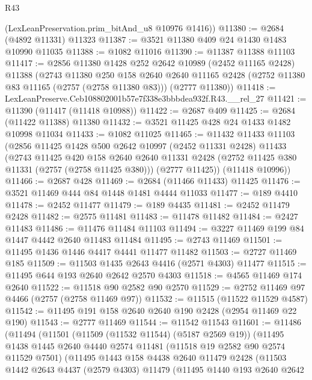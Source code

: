 \begin{lexlean}{R43}
\begin{coremodule}
      (LexLeanPreservation.prim_bitAnd_u8 @10976 @1416))
@11380 := @2684 (@4892 @11331) @11323
@11387 := @3521 @11380 @409 @24 @1430 @1483 @10990 @11035
@11388 := @1082 @11016
@11390 := @11387 @11388 @11103
@11417 := @2856
    @11380
    @1428
    @252
    @2642
    @10989
    (@2452 @11165 @2428)
    @11388
    (@2743
      @11380
      @250
      @158
      @2640
      @2640
      @11165
      @2428
      (@2752 @11380 @83 @11165 (@2757 (@2758 @11380 @83)))
      (@2777 @11380))
@11418 := LexLeanPreserve.Ceb108802001b57e7f338e3bbbdea932f.R43.__rel_27
@11421 := @11390 (@11417 (@11418 @10988))
@11422 := @2687 @409
@11425 := @2684 (@11422 @11388) @11380
@11432 := @3521 @11425 @428 @24 @1433 @1482 @10998 @11034
@11433 := @1082 @11025
@11465 := @11432
    @11433
    @11103
    (@2856
      @11425
      @1428
      @500
      @2642
      @10997
      (@2452 @11331 @2428)
      @11433
      (@2743
        @11425
        @420
        @158
        @2640
        @2640
        @11331
        @2428
        (@2752 @11425 @380 @11331 (@2757 (@2758 @11425 @380)))
        (@2777 @11425))
      (@11418 @10996))
@11466 := @2687 @428
@11469 := @2684 (@11466 @11433) @11425
@11476 := @3521 @11469 @444 @84 @1448 @1481 @4444 @11033
@11477 := @189 @4410
@11478 := @2452 @11477
@11479 := @189 @4435
@11481 := @2452 @11479 @2428
@11482 := @2575 @11481
@11483 := @11478 @11482
@11484 := @2427 @11483
@11486 := @11476 @11484 @11103
@11494 := @3227 @11469 @199 @84 @1447 @4442 @2640 @11483 @11484
@11495 := @2743 @11469
@11501 := @11495 @1436 @1446 @4417 @4441 @11477 @11482
@11503 := @2727 @11469 @185
@11509 := @11503 @1435 @2643 @4416 (@2571 @4303) @11477
@11515 := @11495 @644 @193 @2640 @2642 @2570 @4303
@11518 := @4565 @11469 @174 @2640
@11522 := @11518 @90 @2582 @90 @2570
@11529 := @2752 @11469 @97 @4466 (@2757 (@2758 @11469 @97))
@11532 := @11515 (@11522 @11529 @4587)
@11542 := @11495 @191 @158 @2640 @2640 @190 @2428 (@2954 @11469 @22 @190)
@11543 := @2777 @11469
@11544 := @11542 @11543
@11601 := @11486
    (@11494
      (@11501
        (@11509 (@11532 @11544) (@5187 @2569 @19))
        (@11495
          @1438
          @1445
          @2640
          @4440
          @2574
          @11481
          (@11518 @19 @2582 @90 @2574 @11529 @7501)
          (@11495
            @1443
            @158
            @4438
            @2640
            @11479
            @2428
            (@11503
              @1442
              @2643
              @4437
              (@2579 @4303)
              @11479
              (@11495
                @1440
                @193
                @2640
                @2642

\end{coremodule}
\end{lexlean}

